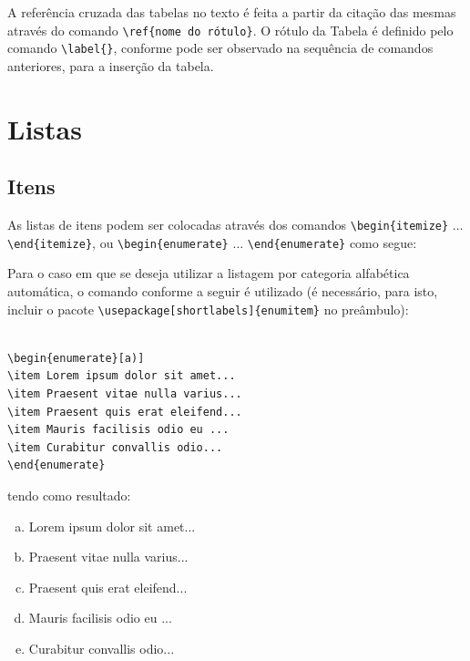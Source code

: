 \documentclass[12pt,A4,A4pt]{article}
\begin{document}
A referência cruzada das tabelas no texto é feita a partir da citação das mesmas através do comando \verb|\ref{nome do rótulo}|. O rótulo da Tabela é definido pelo comando \verb|\label{}|, conforme pode ser observado na sequência de comandos anteriores, para a inserção da tabela.

\section{Listas}

\subsection{Itens}

As listas de itens podem ser colocadas através dos comandos \break \verb|\begin{itemize}| $ \ldots $ \verb|\end{itemize}|, ou \verb|\begin{enumerate}| $ \ldots $ \verb|\end{enumerate}|  como segue:



Para o caso em que se deseja utilizar a listagem por categoria alfabética automática, o comando conforme a seguir é utilizado (é necessário, para isto, incluir o pacote \break \verb|\usepackage[shortlabels]{enumitem}| no preâmbulo):

\begin{verbatim}
    
\begin{enumerate}[a)] 
\item Lorem ipsum dolor sit amet...
\item Praesent vitae nulla varius...
\item Praesent quis erat eleifend...
\item Mauris facilisis odio eu ...
\item Curabitur convallis odio...
\end{enumerate}

\end{verbatim}

tendo como resultado:

\begin{enumerate}[a)] 
\item Lorem ipsum dolor sit amet...
\item Praesent vitae nulla varius...
\item Praesent quis erat eleifend...
\item Mauris facilisis odio eu ...
\item Curabitur convallis odio...
\end{enumerate}
\end{document}
